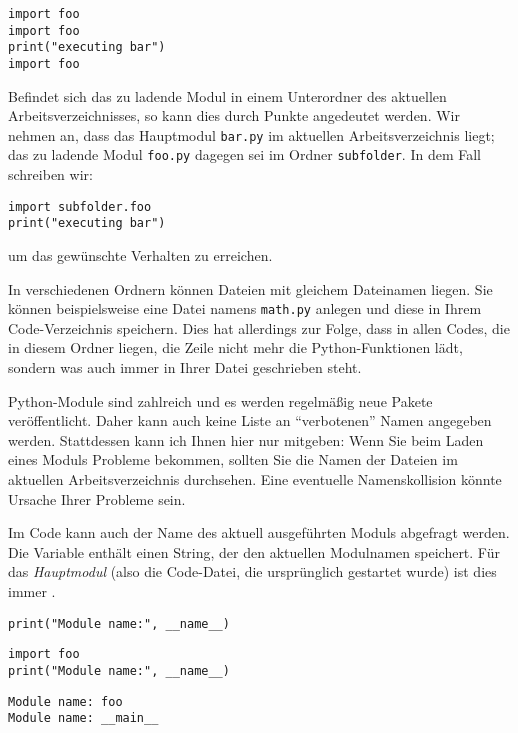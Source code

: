\begin{codebox}
\begin{verbatim}
import foo
import foo
print("executing bar")
import foo
\end{verbatim}
\end{codebox}

Befindet sich das zu ladende Modul in einem Unterordner des aktuellen Arbeitsverzeichnisses, so kann dies durch Punkte angedeutet werden. Wir nehmen an, dass das Hauptmodul \texttt{bar.py} im aktuellen Arbeitsverzeichnis liegt; das zu ladende Modul \texttt{foo.py} dagegen sei im Ordner \texttt{subfolder}. In dem Fall schreiben wir:

\begin{codebox}
\begin{verbatim}
import subfolder.foo
print("executing bar")
\end{verbatim}
\end{codebox}

um das gewünschte Verhalten zu erreichen.

\begin{hintbox}
In verschiedenen Ordnern können Dateien mit gleichem Dateinamen liegen. Sie können beispielsweise eine Datei namens \texttt{math.py} anlegen und diese in Ihrem Code-Verzeichnis speichern. Dies hat allerdings zur Folge, dass in allen Codes, die in diesem Ordner liegen, die Zeile  nicht mehr die Python-Funktionen lädt, sondern was auch immer in Ihrer Datei geschrieben steht.

Python-Module sind zahlreich und es werden regelmäßig neue Pakete veröffentlicht. Daher kann auch keine Liste an \enquote{verbotenen} Namen angegeben werden. Stattdessen kann ich Ihnen hier nur mitgeben: Wenn Sie beim Laden eines Moduls Probleme bekommen, sollten Sie die Namen der Dateien im aktuellen Arbeitsverzeichnis durchsehen. Eine eventuelle Namenskollision könnte Ursache Ihrer Probleme sein.
\end{hintbox}

Im Code kann auch der Name des aktuell ausgeführten Moduls abgefragt werden. Die Variable  enthält einen String, der den aktuellen Modulnamen speichert. Für das \emph{Hauptmodul} (also die Code-Datei, die ursprünglich gestartet wurde) ist dies immer .

\begin{codebox}
\begin{verbatim}
print("Module name:", __name__)
\end{verbatim}
\end{codebox}

\begin{codebox}
\begin{verbatim}
import foo
print("Module name:", __name__)
\end{verbatim}
\end{codebox}

\begin{cmdbox}
\begin{verbatim}
Module name: foo
Module name: __main__
\end{verbatim}
\end{cmdbox}